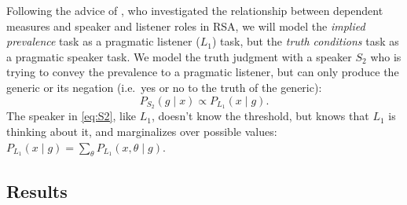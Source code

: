\documentclass[10pt,letterpaper]{article}
\begin{document}
Following the advice of , who investigated the relationship between dependent measures and speaker and listener roles in RSA, we will model the \emph{implied prevalence} task as a pragmatic listener ($L_{1}$) task, but the \emph{truth conditions} task as a pragmatic speaker task. We model the truth judgment with a speaker $S_{2}$ who is trying to convey the prevalence to a pragmatic listener, but can only produce the generic or its negation (i.e.~yes or no to the truth of the generic):
\begin{equation} 
P_{S_{2}}(g \mid x) \propto {P_{L_{1}}(x \mid g)}.
\label{eq:S2}
\end{equation}
The speaker in \eqref{eq:S2}, like $L_{1}$, doesn't know the threshold, but knows that $L_{1}$ is thinking about it, and marginalizes over possible values: $ P_{L_{1}}(x \mid g) = \sum_{\theta} P_{L_{1}}(x , \theta \mid g) $.


%			
%			




%	
%			
%			
%	
%				
%				


\subsection{Results}
\end{document}
